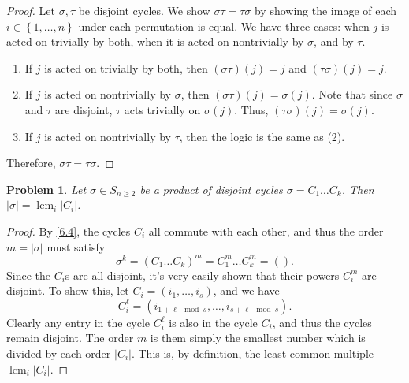\documentclass[11pt, letterpaper]{article}
\theoremstyle{plain}
\newtheorem{problem}{Problem}[section]
\begin{document}
\begin{proof}
	Let $\sigma ,\tau $ be disjoint cycles. We show $\sigma \tau =\tau \sigma $ by showing the image of each $i\in \left\{ 1, \ldots ,n \right\} $ under each permutation is equal. We have three cases: when $j$ is acted on trivially by both, when it is acted on nontrivially by $\sigma $, and by $\tau $.

	\begin{enumerate}
		\item If $j$ is acted on trivially by both, then $(\sigma \tau )(j)=j$ and $(\tau \sigma )(j)=j$.
		\item If $j$ is acted on nontrivially by $\sigma $, then $(\sigma \tau )(j)=\sigma (j)$. Note that since $\sigma $ and $\tau $ are disjoint, $\tau $ acts trivially on $\sigma (j)$. Thus, $(\tau \sigma )(j)=\sigma (j)$.
		\item If $j$ is acted on nontrivially by $\tau $, then the logic is the same as (2).
	\end{enumerate}
	Therefore, $\sigma \tau =\tau \sigma $.
\end{proof}

\begin{problem}
	Let $\sigma \in S_{n\geq 2} $ be a product of disjoint cycles $\sigma =C_1 \ldots C_k$. Then $\left| \sigma  \right| =\operatorname{lcm}_i \left| C_i \right| $.
\end{problem}
\begin{proof}
	By \cref{6.4}, the cycles $C_i$ all commute with each other, and thus the order $m=\left| \sigma  \right| $ must satisfy
	\[
		\sigma ^k = \left( C_1 \ldots C_k \right)^m = C_1^m \ldots C_k^m = ( )
	.\]
	Since the $C_i$s are all disjoint, it's very easily shown that their powers $C_i^m$ are disjoint. To show this, let $C_i = (i_1, \ldots ,i_s)$, and we have
	\[
		C_i^\ell =(i_{1 + \ell \mod{s} }, \ldots , i_{s + \ell \mod{s}} )
	.\]
	Clearly any entry in the cycle $C_i^\ell $ is also in the cycle $C_i$, and thus the cycles remain disjoint. The order $m$ is them simply the smallest number which is divided by each order $\left| C_i \right| $. This is, by definition, the least common multiple $\operatorname{lcm}_i \left| C_i \right| $.
\end{proof}
\end{document}
